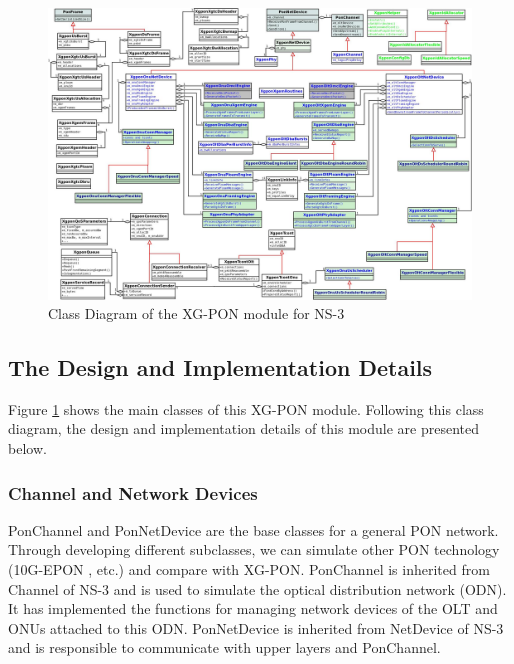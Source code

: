 \begin{landscape}

\begin{figure}[!htbp]
\begin{center}
\includegraphics[width=1.4\textwidth]{images/design_classdiagram}
\end{center}
\vspace{-0.1in}
\caption{Class Diagram of the XG-PON module for NS-3}
\label{fig_xgpon_classdiagram}
\end{figure}

\end{landscape}

\subsection{The Design and Implementation Details}



Figure \ref{fig_xgpon_classdiagram} shows the main classes of this
XG-PON module. Following this class diagram, the design and
implementation details of this module are presented below.

\subsubsection{Channel and Network Devices}

PonChannel and PonNetDevice are the base classes for a general PON
network. Through developing different subclasses, we can simulate
other PON technology (10G-EPON \cite{ieee0910GEPON8023av}, etc.)
and compare with XG-PON. PonChannel is inherited from Channel of
NS-3 and is used to simulate the optical distribution network
(ODN). It has implemented the functions for managing network
devices of the OLT and ONUs attached to this ODN. PonNetDevice is
inherited from NetDevice of NS-3 and is responsible to communicate
with upper layers and PonChannel.


